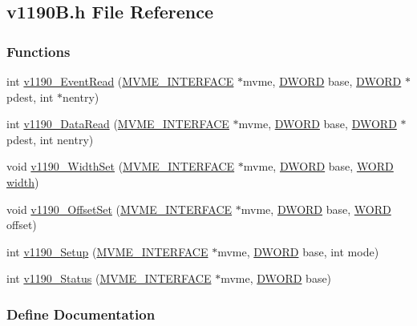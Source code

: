 \subsection{v1190B.h File Reference}
\label{v1190B_8h}
\subsubsection*{Functions}
\begin{DoxyCompactItemize}
\item 
int \hyperlink{v1190B_8h_a2e170ba3dc7d7492affdfad8fbc6338b}{v1190\_\-EventRead} (\hyperlink{structMVME__INTERFACE}{MVME\_\-INTERFACE} $\ast$mvme, \hyperlink{vt2_8h_a798af1e30bc65f319c1a246cecf59e39}{DWORD} base, \hyperlink{vt2_8h_a798af1e30bc65f319c1a246cecf59e39}{DWORD} $\ast$pdest, int $\ast$nentry)
\item 
int \hyperlink{v1190B_8h_a3fb3376a4705f511733ade46e23388e3}{v1190\_\-DataRead} (\hyperlink{structMVME__INTERFACE}{MVME\_\-INTERFACE} $\ast$mvme, \hyperlink{vt2_8h_a798af1e30bc65f319c1a246cecf59e39}{DWORD} base, \hyperlink{vt2_8h_a798af1e30bc65f319c1a246cecf59e39}{DWORD} $\ast$pdest, int nentry)
\item 
void \hyperlink{v1190B_8h_af9175bc6e8cd2dc1c63dbd69d974f8a1}{v1190\_\-WidthSet} (\hyperlink{structMVME__INTERFACE}{MVME\_\-INTERFACE} $\ast$mvme, \hyperlink{vt2_8h_a798af1e30bc65f319c1a246cecf59e39}{DWORD} base, \hyperlink{vt2_8h_a2b0e863dadf920709ec53d9088ee7c91}{WORD} \hyperlink{myexpt_8html_a5558ace5433f9aabbf0a0ec059900d94}{width})
\item 
void \hyperlink{v1190B_8h_a47b04f666b0640f4ec4b5b03a78bcff5}{v1190\_\-OffsetSet} (\hyperlink{structMVME__INTERFACE}{MVME\_\-INTERFACE} $\ast$mvme, \hyperlink{vt2_8h_a798af1e30bc65f319c1a246cecf59e39}{DWORD} base, \hyperlink{vt2_8h_a2b0e863dadf920709ec53d9088ee7c91}{WORD} offset)
\item 
int \hyperlink{v1190B_8h_a08c507c60af774a2828a1e0ff6eac4c2}{v1190\_\-Setup} (\hyperlink{structMVME__INTERFACE}{MVME\_\-INTERFACE} $\ast$mvme, \hyperlink{vt2_8h_a798af1e30bc65f319c1a246cecf59e39}{DWORD} base, int mode)
\item 
int \hyperlink{v1190B_8h_a620a197083a0d776491f7bd620e2effd}{v1190\_\-Status} (\hyperlink{structMVME__INTERFACE}{MVME\_\-INTERFACE} $\ast$mvme, \hyperlink{vt2_8h_a798af1e30bc65f319c1a246cecf59e39}{DWORD} base)
\end{DoxyCompactItemize}


\subsubsection{Define Documentation}
